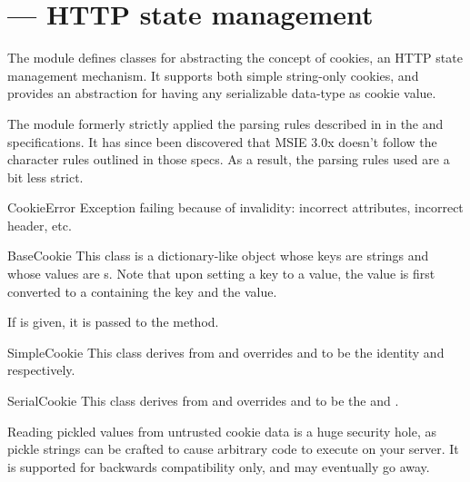 \section{ ---
         HTTP state management}



The  module defines classes for abstracting the concept of 
cookies, an HTTP state management mechanism. It supports both simple
string-only cookies, and provides an abstraction for having any serializable
data-type as cookie value.

The module formerly strictly applied the parsing rules described in in
the  and  specifications.  It has since been discovered
that MSIE 3.0x doesn't follow the character rules outlined in those
specs.  As a result, the parsing rules used are a bit less strict.

\begin{excdesc}{CookieError}
Exception failing because of  invalidity: incorrect
attributes, incorrect  header, etc.
\end{excdesc}

\begin{classdesc}{BaseCookie}{}
This class is a dictionary-like object whose keys are strings and
whose values are s. Note that upon setting a key to
a value, the value is first converted to a  containing
the key and the value.

If  is given, it is passed to the  method.
\end{classdesc}

\begin{classdesc}{SimpleCookie}{}
This class derives from  and overrides
 and  to be the identity
and  respectively.
\end{classdesc}

\begin{classdesc}{SerialCookie}{}
This class derives from  and overrides
 and  to be the
 and  .  

  Reading pickled values from untrusted
cookie data is a huge security hole, as pickle strings can be crafted
to cause arbitrary code to execute on your server.  It is supported
for backwards compatibility only, and may eventually go away.
\end{classdesc}

